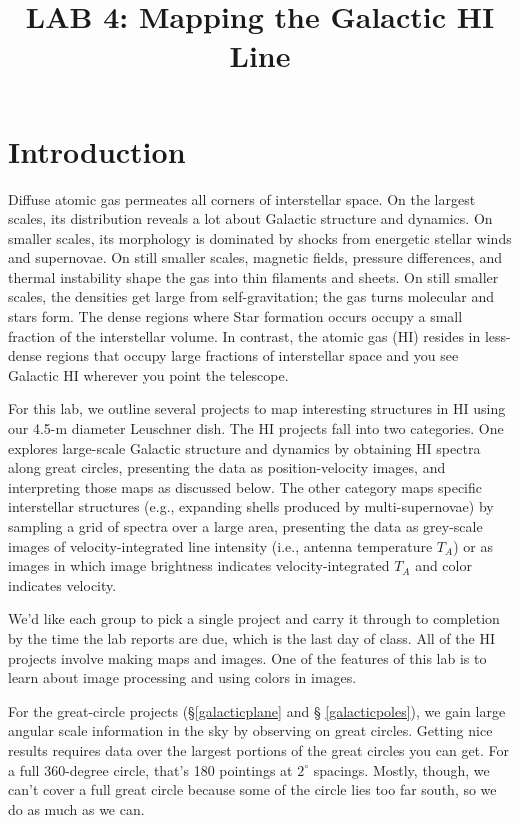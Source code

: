 \documentclass[psfig,preprint]{aastex}
\begin{document}

\title{LAB 4: Mapping the Galactic HI Line}

\tableofcontents


\section{Introduction}

\noindent
Diffuse atomic gas permeates all corners of interstellar space.
On the largest scales, its distribution reveals a lot about Galactic
structure and dynamics. On smaller scales, its morphology is dominated
by shocks from energetic stellar winds and supernovae. On still smaller
scales, magnetic fields, pressure differences, and thermal instability
shape the gas into thin filaments and sheets. On still smaller scales,
the densities get large from self-gravitation; the gas turns molecular
and stars form. 
The dense regions where Star formation occurs occupy a
small fraction of the interstellar volume. In contrast, the atomic gas
(HI) resides in less-dense regions that occupy large fractions of
interstellar space and you see Galactic HI wherever you point the
telescope. 

For this lab, we outline several projects to map interesting structures
in HI using our 4.5-m diameter Leuschner dish. The HI projects
fall into two categories. One explores large-scale Galactic structure
and dynamics by obtaining HI spectra along great circles, presenting the
data as position-velocity images, and interpreting those maps as
discussed below. The other category maps specific interstellar
structures (e.g., expanding shells produced by multi-supernovae) by
sampling a grid of spectra over a large area, presenting the data as
grey-scale images of velocity-integrated line intensity (i.e., antenna
temperature $T_A$) or as images in which image brightness indicates
velocity-integrated $T_A$ and color indicates velocity.

We'd like each group to pick a single project and carry it through to
completion by the time the lab reports are due, which is the last day of
class. All of the HI projects involve making maps and
images. One of the features of this lab is to learn about image
processing and using colors in images.

For the great-circle projects (\S \ref{galacticplane} and \S
\ref{galacticpoles}), we gain large angular scale information
in the sky by observing on great circles. Getting nice results
requires data over the largest portions of the great circles you can
get. For a full 360-degree circle, that's 180 pointings at $2^\circ$
spacings.  Mostly, though, we can't cover a full great circle because
some of the circle lies too far south, so we do as much as we can. 
\end{document}
